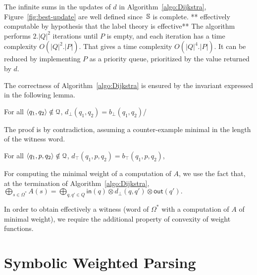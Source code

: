 \noindent
{}
The infinite sums in the updates of $d$ in Algorithm~\ref{algo:Dijkstra}, 
Figure~\ref{fig:best-update}
are well defined
since~$\mathbb{S}$ is complete.
** effectively computable by hypothesis that the label theory is effective**
The algorithm performs $2.|Q|^2$ iterations until $P$ is empty, 
and each iteration has a time complexity $O(|Q|^2 . |P|)$.
That gives a time complexity $O(|Q|^4 . |P|)$. 
It can be reduced by implementing $P$ as a priority queue, 
prioritized by the value returned by $d$.

The correctness of Algorithm~\ref{algo:Dijkstra} 
is ensured by the invariant expressed in the following lemma.
\begin{lemma}\label{lem:bot}
For all $\< q_1, q_2> \notin \Q$,
$d_\bot(q_1, q_2) =  b_\bot(q_1, q_2)$/
\end{lemma}
The proof is by contradiction, 
assuming a counter-example minimal in the length of the witness word.

\begin{lemma}\label{lem:top}
For all $\< q_1, p, q_2> \notin \Q$, 
$d_\top(q_1, p, q_2) =  b_\top(q_1, p, q_2)$,
\end{lemma}

\noindent
For computing the minimal weight of a computation of $A$, we use the fact that,
at the termination of Algorithm~\ref{algo:Dijkstra}, %
\(
  {\displaystyle \bigoplus_{s \in \Omega^*} A(s)} = 
  {\displaystyle\bigoplus_{q, q' \in Q}} \textstyle
  \mathsf{in}(q) \mathop{\otimes} d_\bot(q, q') \mathop{\otimes} \mathsf{out}(q').
\)

\noindent
In order to obtain effectively a witness 
(word of $\Omega^*$ with a computation of $A$ of minimal weight), 
we require the additional property of convexity of weight functions.






\section{Symbolic Weighted Parsing}
\label{sec:parsing}

